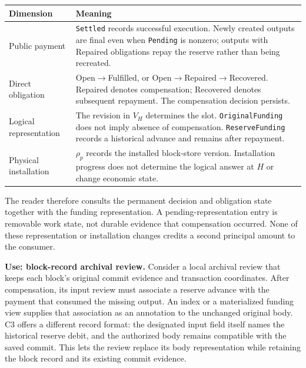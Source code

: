 \par\smallskip
{\small
\setlength{\tabcolsep}{3pt}
\noindent
\begin{tabular}{@{}p{}p{}@{}}
\toprule
Dimension & Meaning \\
\midrule
Public payment &
\texttt{Settled} records successful execution. Newly created outputs are final even when \texttt{Pending} is nonzero; outputs with Repaired obligations repay the reserve rather than being recreated. \\

Direct obligation &
Open$\to$Fulfilled, or Open$\to$Repaired$\to$Recovered.
Repaired denotes compensation; Recovered denotes subsequent repayment.
The compensation decision persists. \\

Logical representation &
The revision in $V_H$ determines the slot.
\texttt{OriginalFunding} does not imply absence of compensation.
\texttt{ReserveFunding} records a historical advance and remains
after repayment. \\

Physical installation &
$\rho_p$ records the installed block-store version.
Installation progress does not determine the logical answer at $H$
or change economic state. \\
\bottomrule
\end{tabular}
\par}

The reader therefore consults the permanent decision and obligation
state together with the funding representation. A pending-representation
entry is removable work state, not durable evidence that compensation
occurred. None of these representation or installation changes credits
a second principal amount to the consumer.

\noindent\textbf{Use: block-record archival review.}
Consider a local archival review that keeps each block's original commit
evidence and transaction coordinates. After compensation, its input review
must associate a reserve advance with the payment that consumed the missing
output. An index or a materialized funding view supplies that association
as an annotation to the unchanged original body. C3 offers a different
record format: the designated input field itself names the historical
reserve debit, and the authorized body remains compatible with the saved
commit. This lets the review replace its body representation while retaining
the block record and its existing commit evidence.

